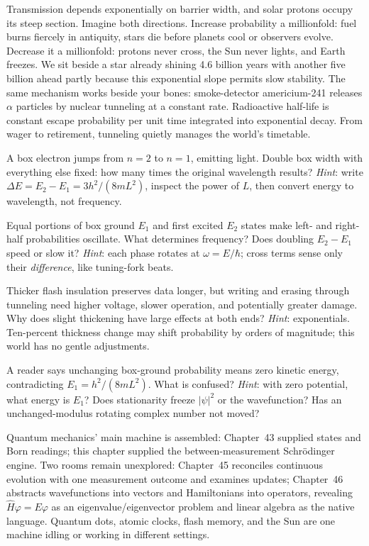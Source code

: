 \begin{thought}
Transmission depends exponentially on barrier width, and solar protons occupy its steep section. Imagine both directions. Increase probability a millionfold: fuel burns fiercely in antiquity, stars die before planets cool or observers evolve. Decrease it a millionfold: protons never cross, the Sun never lights, and Earth freezes. We sit beside a star already shining 4.6 billion years with another five billion ahead partly because this exponential slope permits slow stability. The same mechanism works beside your bones: smoke-detector americium-241 releases \(\alpha\) particles by nuclear tunneling at a constant rate. Radioactive half-life is constant escape probability per unit time integrated into exponential decay. From wager to retirement, tunneling quietly manages the world's timetable.
\end{thought}

\begin{puzzles}
\item A box electron jumps from \(n=2\) to \(n=1\), emitting light. Double box width with everything else fixed: how many times the original wavelength results? \emph{Hint}: write \(\Delta E=E_{2}-E_{1}=3h^{2}/(8mL^{2})\), inspect the power of \(L\), then convert energy to wavelength, not frequency.
\item Equal portions of box ground \(E_{1}\) and first excited \(E_{2}\) states make left- and right-half probabilities oscillate. What determines frequency? Does doubling \(E_{2}-E_{1}\) speed or slow it? \emph{Hint}: each phase rotates at \(\omega=E/\hbar\); cross terms sense only their \emph{difference}, like tuning-fork beats.
\item Thicker flash insulation preserves data longer, but writing and erasing through tunneling need higher voltage, slower operation, and potentially greater damage. Why does slight thickening have large effects at both ends? \emph{Hint}: exponentials. Ten-percent thickness change may shift probability by orders of magnitude; this world has no gentle adjustments.
\item A reader says unchanging box-ground probability means zero kinetic energy, contradicting \(E_{1}=h^{2}/(8mL^{2})\). What is confused? \emph{Hint}: with zero potential, what energy is \(E_{1}\)? Does stationarity freeze \(|\psi|^{2}\) or the wavefunction? Has an unchanged-modulus rotating complex number not moved?
\end{puzzles}

Quantum mechanics' main machine is assembled: Chapter~43 supplied states and Born readings; this chapter supplied the between-measurement Schrödinger engine. Two rooms remain unexplored: Chapter~45 reconciles continuous evolution with one measurement outcome and examines updates; Chapter~46 abstracts wavefunctions into vectors and Hamiltonians into operators, revealing \(\hat{H}\varphi=E\varphi\) as an eigenvalue/eigenvector problem and linear algebra as the native language. Quantum dots, atomic clocks, flash memory, and the Sun are one machine idling or working in different settings.
